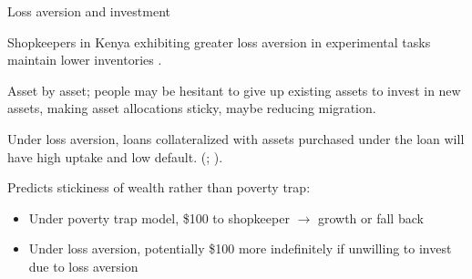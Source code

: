 \documentclass[aspectratio=169, 10pt, handout]{beamer}
\newenvironment{wideitemize}{\itemize\addtolength{\itemsep}{10pt}}{\enditemize}
\begin{document}
\begin{frame}{Loss aversion and investment}

\begin{wideitemize}

	\item Shopkeepers in Kenya exhibiting greater loss aversion in experimental tasks maintain lower inventories \citep{kremer2013behavioral}.
	
	\item Asset by asset; people may be hesitant to give up existing assets to invest in new assets, making asset allocations sticky, maybe reducing migration.

	\item Under loss aversion, loans collateralized with assets purchased under the loan will have high uptake and low default. (\cite{jack2016borrowing}; \cite{carney2018}).
	
	\item Predicts stickiness of wealth rather than poverty trap:
	
	\begin{itemize}
	
		\item Under poverty trap model, \$100 to shopkeeper $\rightarrow$ growth or fall back
	
		\item Under loss aversion, potentially \$100 more indefinitely if unwilling to invest due to loss aversion

	\end{itemize}
	
\end{wideitemize}

\end{frame}
\end{document}
